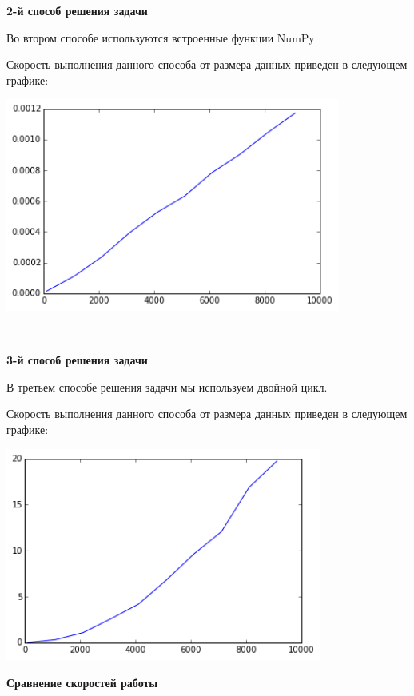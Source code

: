 \documentclass[12pt, a4paper]{article}
\begin{document}
			{\bf 2-й способ решения задачи\\}

				Во втором способе используются встроенные функции NumPy

				Скорость выполнения данного способа от размера данных приведен в следующем графике:
				\begin{center}
					\includegraphics[height=7cm]{timeit/num3_ti2.png}
				\end{center}
				~\newline


			{\bf 3-й способ решения задачи\\}

				В третьем способе решения задачи мы используем двойной цикл.

				Скорость выполнения данного способа от размера данных приведен в следующем графике:
				\begin{center}
					\includegraphics[height=7cm]{timeit/num3_ti3.png}
				\end{center}


			{\bf Сравнение скоростей работы\\}
\end{document}
